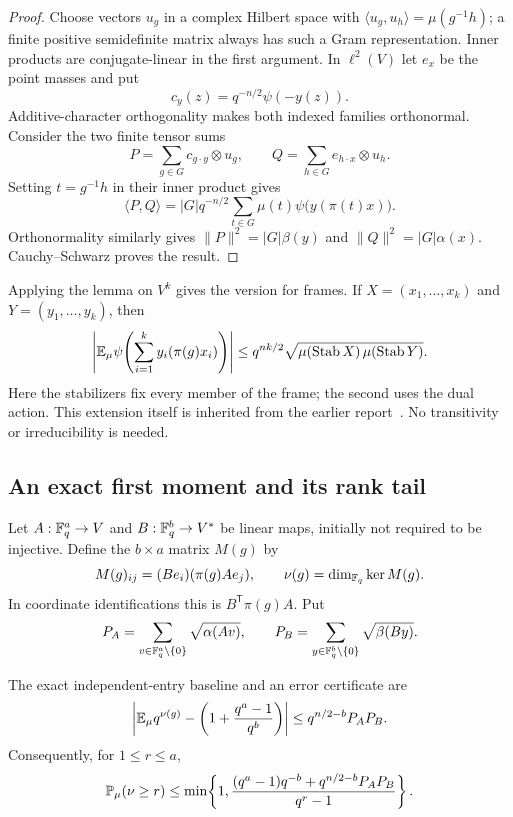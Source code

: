 \begin{proof}
Choose vectors $u_g$ in a complex Hilbert space with
$\langle u_g,u_h\rangle=\mu(g^{-1}h)$; a finite positive semidefinite
matrix always has such a Gram representation. Inner products are
conjugate-linear in the first argument. In $\ell^2(V)$ let $e_x$ be the
point masses and put
\[
 c_y(z)=q^{-n/2}\psi(-y(z)).
\]
Additive-character orthogonality makes both indexed families orthonormal.
Consider the two finite tensor sums
\[
 P=\sum_{g\in G}c_{g\cdot y}\otimes u_g,
 \qquad
 Q=\sum_{h\in G}e_{h\cdot x}\otimes u_h.
\]
Setting $t=g^{-1}h$ in their inner product gives
\[
 \langle P,Q\rangle
 =|G|q^{-n/2}\sum_{t\in G}\mu(t)\psi\bigl(y(\pi(t)x)\bigr).
\]
Orthonormality similarly gives
$\|P\|^2=|G|\beta(y)$ and $\|Q\|^2=|G|\alpha(x)$.
Cauchy--Schwarz proves the result.
\end{proof}

Applying the lemma on $V^k$ gives the version for frames. If
$X=(x_1,\ldots,x_k)$ and $Y=(y_1,\ldots,y_k)$, then
\begin{equation}
 \left|\mathbb E_\mu\psi\!\left(\sum_{i=1}^k y_i(\pi(g)x_i)\right)\right|
 \le q^{nk/2}
       \sqrt{\mu(\operatorname{Stab}X)\,
                    \mu(\operatorname{Stab}Y)}.
 \label{eq:frame-coefficient}
\end{equation}
Here the stabilizers fix every member of the frame; the second uses the
dual action. This extension itself is inherited from the earlier
report~\cite{priorSymplectic}. No transitivity or irreducibility is needed.

\subsection{An exact first moment and its rank tail}

Let $A:\mathbb F_q^a\to V$ and $B:\mathbb F_q^b\to V^*$ be linear maps, initially
not required to be injective. Define the $b\times a$ matrix $M(g)$ by
\[
 M(g)_{ij}=(Be_i)(\pi(g)Ae_j),\qquad
 \nu(g)=\dim_{\mathbb F_q}\ker M(g).
\]
In coordinate identifications this is $B^{\mathsf T}\pi(g)A$. Put
\[
 P_A=\sum_{v\in\mathbb F_q^a\setminus\{0\}}\sqrt{\alpha(Av)},
 \qquad
 P_B=\sum_{y\in\mathbb F_q^b\setminus\{0\}}\sqrt{\beta(By)}.
\]

\begin{proposition}
\label{prop:kernel-first-moment}
The exact independent-entry baseline and an error certificate are
\begin{equation}
 \left|\mathbb E_\mu q^{\nu(g)}-
      \left(1+\frac{q^a-1}{q^b}\right)\right|
 \le q^{n/2-b}P_AP_B.
 \label{eq:first-kernel-moment}
\end{equation}
Consequently, for $1\le r\le a$,
\begin{equation}
 \mathbb P_\mu(\nu\ge r)
 \le \min\!\left\{1,
 \frac{(q^a-1)q^{-b}+q^{n/2-b}P_AP_B}{q^r-1}\right\}.
 \label{eq:first-kernel-tail}
\end{equation}
\end{proposition}

